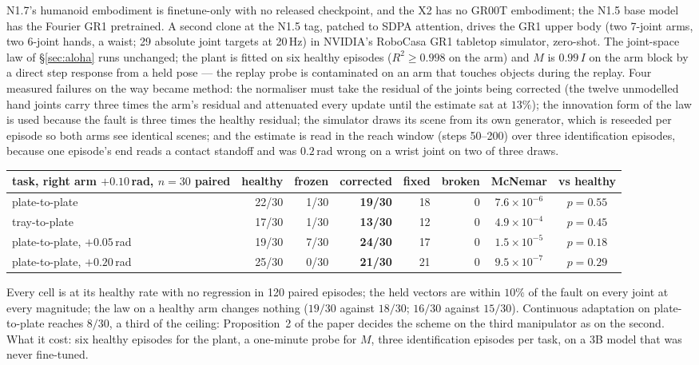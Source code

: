 \documentclass[11pt,a4paper]{article}
\begin{document}
N1.7's humanoid embodiment is finetune-only with no released checkpoint, and the X2 has no
GR00T embodiment; the N1.5 base model has the Fourier GR1 pretrained. A second clone at the
N1.5 tag, patched to SDPA attention, drives the GR1 upper body (two 7-joint arms, two 6-joint
hands, a waist; 29 absolute joint targets at 20\,Hz) in NVIDIA's RoboCasa GR1 tabletop
simulator, zero-shot. The joint-space law of \S\ref{sec:aloha} runs unchanged; the plant is
fitted on six healthy episodes ($R^2\ge0.998$ on the arm) and $M$ is $0.99\,I$ on the arm
block by a direct step response from a held pose --- the replay probe is contaminated on an
arm that touches objects during the replay. Four measured failures on the way became method:
the normaliser must take the residual of the joints being corrected (the twelve unmodelled
hand joints carry three times the arm's residual and attenuated every update until the
estimate sat at $13\%$); the innovation form of the law is used because the fault is three
times the healthy residual; the simulator draws its scene from its own generator, which is
reseeded per episode so both arms see identical scenes; and the estimate is read in the reach
window (steps 50--200) over three identification episodes, because one episode's end reads a
contact standoff and was $0.2$\,rad wrong on a wrist joint on two of three draws.

\begin{center}\small
\begin{tabular}{lrrrrrcc}
\toprule
task, right arm $+0.10$\,rad, $n=30$ paired & healthy & frozen & corrected & fixed & broken & McNemar & vs healthy \\
\midrule
plate-to-plate & 22/30 & 1/30 & \textbf{19/30} & 18 & 0 & $7.6\times10^{-6}$ & $p=0.55$ \\
tray-to-plate & 17/30 & 1/30 & \textbf{13/30} & 12 & 0 & $4.9\times10^{-4}$ & $p=0.45$ \\
\midrule
plate-to-plate, $+0.05$\,rad & 19/30 & 7/30 & \textbf{24/30} & 17 & 0 & $1.5\times10^{-5}$ & $p=0.18$ \\
plate-to-plate, $+0.20$\,rad & 25/30 & 0/30 & \textbf{21/30} & 21 & 0 & $9.5\times10^{-7}$ & $p=0.29$ \\
\bottomrule
\end{tabular}
\end{center}

Every cell is at its healthy rate with no regression in 120 paired episodes; the held vectors
are within $10\%$ of the fault on every joint at every magnitude; the law on a healthy arm
changes nothing ($19/30$ against $18/30$; $16/30$ against $15/30$). Continuous adaptation on
plate-to-plate reaches $8/30$, a third of the ceiling: Proposition~2 of the paper decides the
scheme on the third manipulator as on the second. What it cost: six healthy episodes for the
plant, a one-minute probe for $M$, three identification episodes per task, on a 3B model that
was never fine-tuned.
\end{document}
